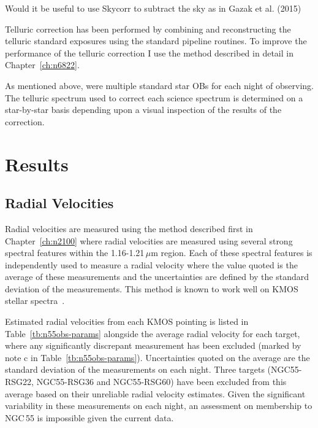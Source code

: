 Would it be useful to use Skycorr to subtract the sky as in Gazak et al. (2015)

Telluric correction has been performed by combining and reconstructing the telluric standard exposures using the standard pipeline routines.
To improve the performance of the telluric correction I use the method described in detail in Chapter~\ref{ch:n6822}.

As mentioned above, were multiple standard star OBs for each night of observing.
The telluric spectrum used to correct each science spectrum is determined on a star-by-star basis depending upon a visual inspection of the results of the correction.


\section{Results} %
\label{sec:results}

\subsection{Radial Velocities} %
\label{sub:rvs}
Radial velocities are measured using the method described first in Chapter~\ref{ch:n2100} where radial velocities are measured using several strong spectral features within the 1.16-1.21\,$\mu$m region.
Each of these spectral features is independently used to measure a radial velocity where the value quoted is the average of these measurements and the uncertainties are defined by the standard deviation of the measurements.
This method is known to work well on KMOS stellar spectra~\cite{2015ApJ...798...23L,2015ApJ...803...14P,2016arXiv160202702P}.

Estimated radial velocities from each KMOS pointing is listed in Table~\ref{tb:n55obs-params} alongside the average radial velocity for each target, where any significantly discrepant measurement has been excluded (marked by note c in Table~\ref{tb:n55obs-params}).
Uncertainties quoted on the average are the standard deviation of the measurements on each night.
Three targets (NGC55-RSG22, NGC55-RSG36 and NGC55-RSG60) have been excluded from this average based on their unreliable radial velocity estimates.
Given the significant variability in these measurements on each night, an assessment on membership to NGC\,55 is impossible given the current data.

